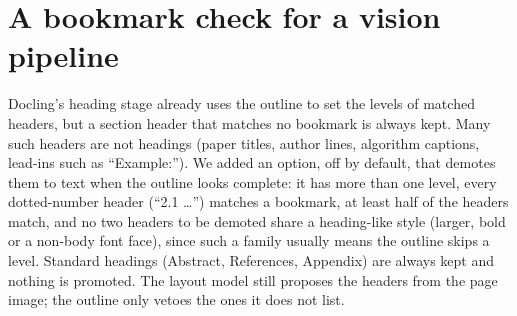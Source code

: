 \documentclass[10pt,twocolumn,letterpaper]{article}
\begin{document}
\section{A bookmark check for a vision pipeline}
\label{sec:docling}

Docling's heading stage already uses the outline to set the levels of matched headers, but a section
header that matches no bookmark is always kept. Many such headers are not
headings (paper titles, author lines, algorithm captions, lead-ins such as ``Example:''). We added an
option, off by default, that demotes them to text when the outline looks complete: it has more than
one level, every dotted-number header (``2.1 \ldots'') matches a bookmark, at least half of the
headers match, and no two headers to be demoted share a heading-like style (larger, bold or a
non-body font face), since such a family usually means the outline skips a level. Standard headings
(Abstract, References, Appendix) are always kept and nothing is promoted. The layout model still
proposes the headers from the page image; the outline only vetoes the ones it does not list.
\end{document}
